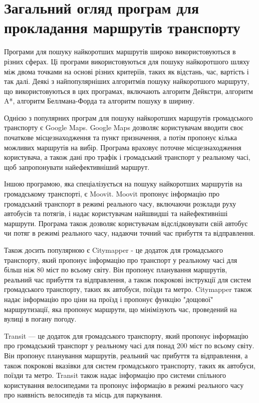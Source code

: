 \section{Загальний огляд програм для прокладання маршрутів транспорту}
\label{sec:existing-sulutions}

Програми для пошуку найкоротших маршрутів широко використовуються в різних сферах. Ці програми використовуються для пошуку найкоротшого шляху між двома точками на основі різних критеріїв, таких як відстань, час, вартість і так далі. Деякі з найпопулярніших алгоритмів пошуку найкоротшого маршруту, що використовуються в цих програмах, включають алгоритм Дейкстри, алгоритм A*, алгоритм Беллмана-Форда та алгоритм пошуку в ширину.

Однією з популярних програм для пошуку найкоротших маршрутів громадського транспорту є Google Maps. Google Maps дозволяє користувачам вводити своє початкове місцезнаходження та пункт призначення, а потім пропонує кілька можливих маршрутів на вибір. Програма враховує поточне місцезнаходження користувача, а також дані про трафік і громадський транспорт у реальному часі, щоб запропонувати найефективніший маршрут.

Іншою програмою, яка спеціалізується на пошуку найкоротших маршрутів на громадському транспорті, є Moovit. Moovit пропонує інформацію про громадський транспорт в режимі реального часу, включаючи розклади руху автобусів та потягів, і надає користувачам найшвидші та найефективніші маршрути. Програма також дозволяє користувачам відслідковувати свій автобус чи потяг в режимі реального часу, надаючи точний час прибуття та відправлення.

Також досить популярною є Citymapper - це додаток для громадського транспорту, який пропонує інформацію про транспорт у реальному часі для більш ніж 80 міст по всьому світу. Він пропонує планування маршрутів, реальний час прибуття та відправлення, а також покрокові інструкції для систем громадського транспорту, таких як автобуси, поїзди та метро. Citymapper також надає інформацію про ціни на проїзд і пропонує функцію "дощової" маршрутизації, яка пропонує маршрути, що мінімізують час, проведений на вулиці в погану погоду.

Transit --- це додаток для громадського транспорту, який пропонує інформацію про громадський транспорт у реальному часі для понад 200 міст по всьому світу. Він пропонує планування маршрутів, реальний час прибуття та відправлення, а також покрокові вказівки для систем громадського транспорту, таких як автобуси, поїзди та метро. Transit також надає інформацію про системи спільного користування велосипедами та пропонує інформацію в режимі реального часу про наявність велосипедів та місць для паркування.

